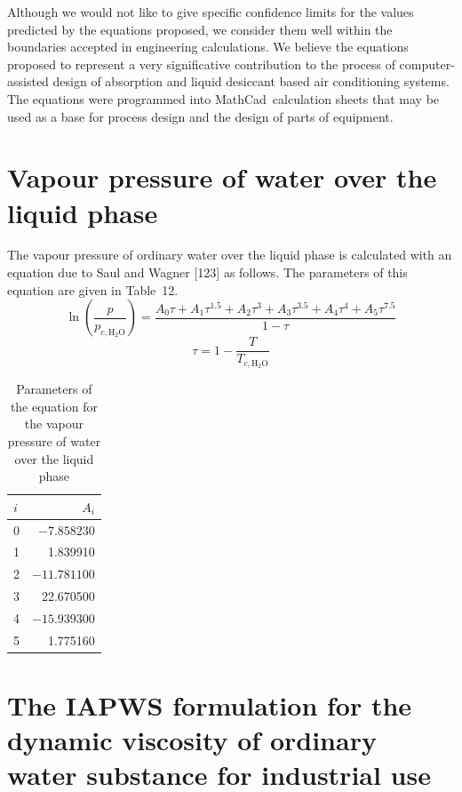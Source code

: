 \documentclass[11pt]{article}
\begin{document}
Although we would not like to give specific confidence limits for the values predicted by
the equations proposed, we consider them well within the boundaries accepted in
engineering calculations. We believe the equations proposed to represent a very
significative contribution to the process of computer-assisted design of absorption and
liquid desiccant based air conditioning systems. The equations were programmed into
MathCad\textregistered\ calculation sheets that may be used as a base for process design
and the design of parts of equipment.

\appendix

\section{Vapour pressure of water over the liquid phase}

The vapour pressure of ordinary water over the liquid phase is calculated with an equation
due to Saul and Wagner [123] as follows. The parameters of this equation are given in
Table~12.
\begin{equation}
\ln\left(\frac{p}{p_{c,\mathrm{H_2O}}}\right) = \frac{A_0 \tau + A_1 \tau^{1.5} + A_2
\tau^3 + A_3 \tau^{3.5} + A_4 \tau^4 + A_5 \tau^{7.5}}{1 - \tau}
\end{equation}
\begin{equation}
\tau = 1 - \frac{T}{T_{c,\mathrm{H_2O}}}
\end{equation}

\begin{table}[htbp]
\centering
\caption{Parameters of the equation for the vapour pressure of water over the liquid
phase}
\begin{tabular}{lr}
\toprule
$i$ & $A_i$ \\
\midrule
0 & $-7.858230$ \\
1 & 1.839910 \\
2 & $-11.781100$ \\
3 & 22.670500 \\
4 & $-15.939300$ \\
5 & 1.775160 \\
\bottomrule
\end{tabular}
\end{table}

\section{The IAPWS formulation for the dynamic viscosity of ordinary water substance for
industrial use}
\end{document}
